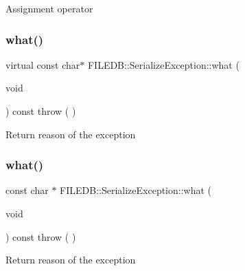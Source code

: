 Assignment operator \mbox{\label{classFILEDB_1_1SerializeException_a1c143c27480a4c2d85f20a19b3061add}} 
\subsubsection{\texorpdfstring{what()}{what()}\hspace{0.1cm}{\footnotesize\ttfamily [1/2]}}
{\footnotesize\ttfamily virtual const char$\ast$ F\+I\+L\+E\+D\+B\+::\+Serialize\+Exception\+::what (\begin{DoxyParamCaption}\item[{void}]{ }\end{DoxyParamCaption}) const throw ( ) \hspace{0.3cm}{\ttfamily [virtual]}}

Return reason of the exception \mbox{\label{classFILEDB_1_1SerializeException_a71ecca567a36c3b247d936b5e98e4707}} 
\subsubsection{\texorpdfstring{what()}{what()}\hspace{0.1cm}{\footnotesize\ttfamily [2/2]}}
{\footnotesize\ttfamily const char $\ast$ F\+I\+L\+E\+D\+B\+::\+Serialize\+Exception\+::what (\begin{DoxyParamCaption}\item[{void}]{ }\end{DoxyParamCaption}) const throw ( ) \hspace{0.3cm}{\ttfamily [virtual]}}

Return reason of the exception

